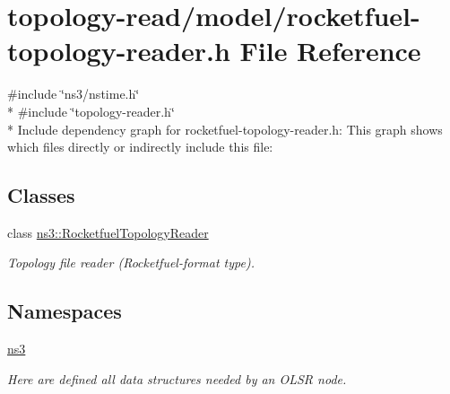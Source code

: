 \hypertarget{rocketfuel-topology-reader_8h}{}\section{topology-\/read/model/rocketfuel-\/topology-\/reader.h File Reference}
\label{rocketfuel-topology-reader_8h}
{\ttfamily \#include \char`\"{}ns3/nstime.\+h\char`\"{}}\\*
{\ttfamily \#include \char`\"{}topology-\/reader.\+h\char`\"{}}\\*
Include dependency graph for rocketfuel-\/topology-\/reader.h\+:
This graph shows which files directly or indirectly include this file\+:
\subsection*{Classes}
\begin{DoxyCompactItemize}
\item 
class \hyperlink{classns3_1_1RocketfuelTopologyReader}{ns3\+::\+Rocketfuel\+Topology\+Reader}
\begin{DoxyCompactList}\small\item\em Topology file reader (Rocketfuel-\/format type). \end{DoxyCompactList}\end{DoxyCompactItemize}
\subsection*{Namespaces}
\begin{DoxyCompactItemize}
\item 
 \hyperlink{namespacens3}{ns3}
\begin{DoxyCompactList}\small\item\em Here are defined all data structures needed by an O\+L\+SR node. \end{DoxyCompactList}\end{DoxyCompactItemize}
